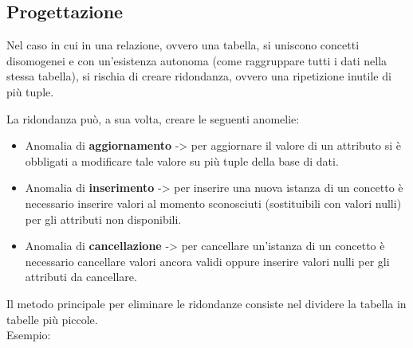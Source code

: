 \documentclass[a4paper, 10pt]{report}
\begin{document}
\subsection*{Progettazione}
Nel caso in cui in una relazione, ovvero una tabella, si uniscono concetti disomogenei e con un'esistenza autonoma (come raggruppare tutti i dati nella stessa tabella), si rischia di creare ridondanza, ovvero una ripetizione inutile di più tuple.

\noindent La ridondanza può, a sua volta, creare le seguenti anomelie:
\begin{itemize}
			\item Anomalia di \textbf{aggiornamento} -> per aggiornare il valore di
			un attributo si è obbligati a modificare tale valore su più tuple
			della base di dati.
			\item Anomalia di \textbf{inserimento} -> per inserire una nuova istanza
			di un concetto è necessario inserire valori al momento
			sconosciuti (sostituibili con valori nulli) per gli attributi non
			disponibili.
			\item Anomalia di \textbf{cancellazione} -> per cancellare un'istanza di un
			concetto è necessario cancellare valori ancora validi oppure
			inserire valori nulli per gli attributi da cancellare.
		\end{itemize}

\noindent Il metodo principale per eliminare le ridondanze consiste nel dividere la tabella in tabelle più piccole.\\

\noindent Esempio:\\

\end{document}
